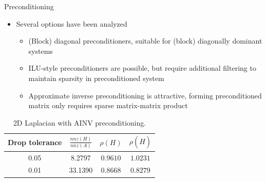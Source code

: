 \documentclass{beamer}
\begin{document}
\begin{frame}{Preconditioning}
  \begin{itemize}
    \item Several options have been analyzed
      \begin{itemize}
        \item (Block) diagonal preconditioners, suitable for (block)
          diagonally dominant systems
        \item ILU-style preconditioners are possible, but require additional
          filtering to maintain sparsity in preconditioned system
        \item Approximate inverse preconditioning is attractive, forming
          preconditioned matrix only requires sparse matrix-matrix product
      \end{itemize}
  \end{itemize}

  \begin{table}
  \centering
  \caption{2D Laplacian with AINV preconditioning.}
  \begin{tabular}{cccc}
  \toprule
  \textbf{Drop tolerance} & \textbf{$\frac{nnz(H)}{nnz(A)}$}& $\rho(H)$
  &$\rho(\hat{H})$\\
  \midrule
   0.05 & 8.2797 & $0.9610$ & $1.0231$  \\
   0.01 & 33.1390 & $0.8668$ & $0.8279$ \\
  \bottomrule
  \end{tabular}
  \end{table}
\end{frame}

\end{document}
